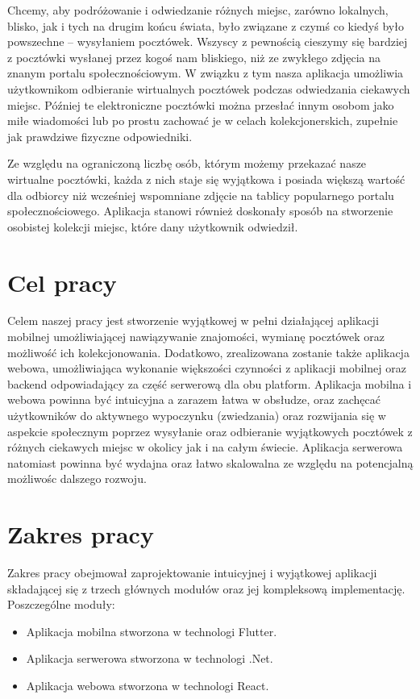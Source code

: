 \documentclass[a4paper,twoside,12pt]{book}
\begin{document}
Chcemy, aby podróżowanie i odwiedzanie różnych miejsc, zarówno lokalnych, blisko, jak i tych na drugim końcu świata, było związane z czymś co kiedyś było powszechne -- wysyłaniem pocztówek. Wszyscy z pewnością cieszymy się bardziej z pocztówki wysłanej przez kogoś nam bliskiego, niż ze zwykłego zdjęcia na znanym portalu społecznościowym. W związku z tym nasza aplikacja umożliwia użytkownikom odbieranie wirtualnych pocztówek podczas odwiedzania ciekawych miejsc. Później te elektroniczne pocztówki można przesłać innym osobom jako miłe wiadomości lub po prostu zachować je w celach kolekcjonerskich, zupełnie jak prawdziwe fizyczne odpowiedniki.

Ze względu na ograniczoną liczbę osób, którym możemy przekazać nasze wirtualne pocztówki, każda z nich staje się wyjątkowa i posiada większą wartość dla odbiorcy niż wcześniej wspomniane zdjęcie na tablicy popularnego portalu społecznościowego. Aplikacja stanowi również doskonały sposób na stworzenie osobistej kolekcji miejsc, które dany użytkownik odwiedził.

\newpage

\section{Cel pracy}
Celem naszej pracy jest stworzenie wyjątkowej w pełni działającej aplikacji mobilnej umożliwiającej nawiązywanie znajomości, wymianę pocztówek oraz możliwość ich kolekcjonowania.
Dodatkowo, zrealizowana zostanie także aplikacja webowa, umożliwiająca wykonanie większości czynności z aplikacji mobilnej oraz backend odpowiadający za część serwerową dla obu platform.
Aplikacja mobilna i webowa powinna być intuicyjna a zarazem łatwa w obsłudze, oraz zachęcać użytkowników do aktywnego wypoczynku (zwiedzania) oraz rozwijania się w aspekcie społecznym poprzez wysyłanie oraz odbieranie wyjątkowych pocztówek z różnych ciekawych miejsc w okolicy jak i na całym świecie.
Aplikacja serwerowa natomiast powinna być wydajna oraz łatwo skalowalna ze względu na potencjalną możliwośc dalszego rozwoju.

\section{Zakres pracy}
Zakres pracy obejmował zaprojektowanie intuicyjnej i wyjątkowej aplikacji składającej się z trzech głównych modułów oraz jej kompleksową implementację.
\\
Poszczególne moduły:
\begin{itemize}
    \item Aplikacja mobilna stworzona w technologi Flutter.
    \item Aplikacja serwerowa stworzona w technologi .Net.
    \item Aplikacja webowa stworzona w technologi React.
\end{itemize}
\end{document}
